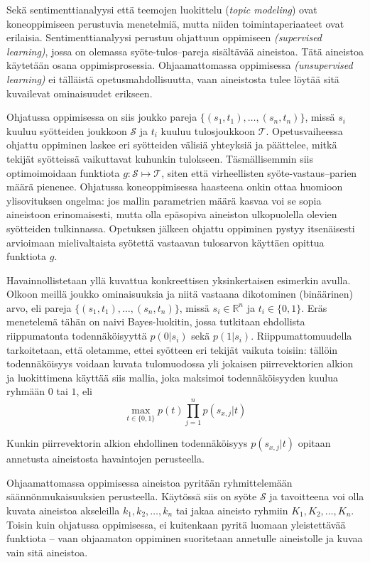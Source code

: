 \documentclass[finnish,gradu,twoside,12pt]{tktltiki}
\begin{document}
{Sekä sentimenttianalyysi että teemojen luokittelu (\textit{topic modeling}) ovat koneoppimiseen perustuvia menetelmiä, mutta niiden toimintaperiaateet ovat erilaisia. Sentimenttianalyysi perustuu ohjattuun oppimiseen \textit{(supervised learning)}, jossa on olemassa syöte-tulos--pareja sisältävää aineistoa. Tätä aineistoa käytetään osana oppimisprosessia. Ohjaamattomassa oppimisessa \textit{(unsupervised learning)} ei tälläistä opetusmahdollisuutta, vaan aineistosta tulee löytää sitä kuvailevat ominaisuudet erikseen.

Ohjatussa oppimisessa on siis joukko pareja $\{ (s_1, t_1), \ldots , (s_n, t_n) \}$, missä $s_i$ kuuluu syötteiden joukkoon $\mathcal{S}$ ja $t_i$ kuuluu tulosjoukkoon  $\mathcal{T}$. Opetusvaiheessa ohjattu oppiminen laskee eri syötteiden välisiä yhteyksiä ja päättelee, mitkä tekijät syötteissä vaikuttavat kuhunkin tulokseen. Täsmällisemmin siis optimoimoidaan funktiota $g: \mathcal{S} \mapsto \mathcal{T}$, siten että virheellisten syöte-vastaus--parien määrä pienenee. Ohjatussa koneoppimisessa haasteena onkin ottaa huomioon ylisovituksen ongelma: jos mallin parametrien määrä kasvaa voi se sopia aineistoon erinomaisesti, mutta olla epäsopiva aineiston ulkopuolella olevien syötteiden tulkinnassa. Opetuksen jälkeen ohjattu oppiminen pystyy itsenäisesti arvioimaan mielivaltaista syötettä vastaavan tulosarvon käyttäen opittua funktiota $g$.

Havainnollistetaan yllä kuvattua konkreettisen yksinkertaisen esimerkin avulla. Olkoon meillä joukko ominaisuuksia ja niitä vastaana dikotominen (binäärinen) arvo, eli pareja $\{ (s_1, t_1), \ldots , (s_n, t_n) \}$, missä $s_i \in \mathbb{R}^n$ ja $t_i \in \{0,1\}$. Eräs menetelemä tähän on naivi Bayes-luokitin, jossa tutkitaan ehdollista riippumatonta todennäköisyyttä $p( 0 | s_i )$ sekä $p( 1 | s_i )$. Riippumattomuudella tarkoitetaan, että oletamme, ettei syötteen eri tekijät vaikuta toisiin: tällöin todennäköisyys voidaan kuvata tulomuodossa yli jokaisen piirrevektorien alkion ja luokittimena käyttää siis mallia, joka maksimoi todennäköisyyden kuulua ryhmään $0$ tai $1$, eli  $$\max_{t \in \{0,1\}} p(t) \prod_{j=1}^n p( s_{x,j} | t) $$

Kunkin piirrevektorin alkion ehdollinen todennäköisyys $p( s_{x,j} | t)$ opitaan annetusta aineistosta havaintojen perusteella.

Ohjaamattomassa oppimisessa aineistoa pyritään ryhmittelemään säännönmukaisuuksien perusteella. Käytössä siis on syöte $\mathcal{S}$ ja tavoitteena voi olla kuvata aineistoa akseleilla $k_1, k_2, \ldots , k_n$ tai jakaa aineisto ryhmiin $K_1, K_2, \ldots, K_n$. Toisin kuin ohjatussa oppimisessa, ei kuitenkaan pyritä luomaan yleistettävää funktiota -- vaan ohjaamaton oppiminen suoritetaan annetulle aineistolle ja kuvaa vain sitä aineistoa.

}
\end{document}
